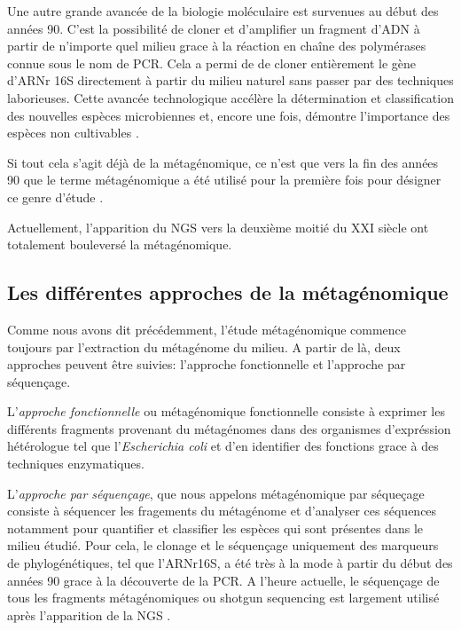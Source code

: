           Une autre grande avancée de la biologie moléculaire est survenues au début des années 90. C'est la possibilité de cloner et d'amplifier un fragment d'ADN à partir de n'importe quel milieu grace à la réaction en chaîne des polymérases connue sous le nom de PCR. Cela a permi de de cloner entièrement le gène d'ARNr 16S directement à partir du milieu naturel sans passer par des techniques laborieuses. Cette avancée technologique accélère la détermination et classification des nouvelles espèces microbiennes et, encore une fois, démontre l'importance des espèces non cultivables \cite{Schmidt1991}.

          Si tout cela s'agit déjà de la métagénomique, ce n'est que vers la fin des années 90 que le terme \og métagénomique \fg a été utilisé pour la première fois pour désigner ce genre d'étude \cite{Handelsman1998}.

          Actuellement, l'apparition du NGS vers la deuxième moitié du XXI siècle ont totalement bouleversé la métagénomique. 
                   
\subsection{Les différentes approches de la métagénomique}

Comme nous avons dit précédemment, l'étude métagénomique commence toujours par l'extraction du métagénome du milieu. A partir de là, deux approches peuvent être suivies: l'approche fonctionnelle et l'approche par séquençage.            

          L'\textit{approche fonctionnelle} ou métagénomique fonctionnelle consiste à exprimer les différents fragments provenant du métagénomes dans des organismes d'expréssion hétérologue tel que l'\textit{Escherichia coli} et d'en identifier des fonctions grace à des techniques enzymatiques.

          L'\textit{approche par séquençage}, que nous appelons métagénomique par séqueçage consiste à séquencer les fragements du métagénome et d'analyser ces séquences notamment pour quantifier et classifier les espèces qui sont présentes dans le milieu étudié. Pour cela, le clonage et le séquençage uniquement des marqueurs de phylogénétiques, tel que l'ARNr16S, a été très à la mode à partir du début des années 90 grace à la découverte de la PCR. A l'heure actuelle, le séquençage de tous les fragments métagénomiques ou shotgun sequencing est largement utilisé après l'apparition de la NGS \cite{Ranjan2015}.


